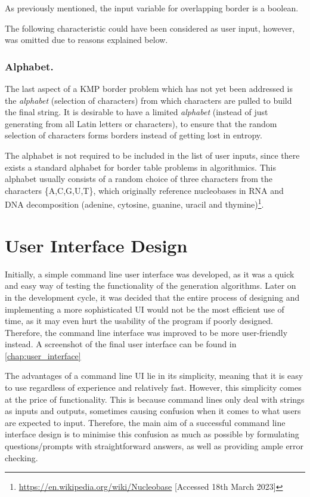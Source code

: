 \documentclass{l4proj}
\begin{document}
As previously mentioned, the input variable for overlapping border is a boolean.

The following characteristic could have been considered as user input, however, was omitted due to reasons explained below.

\subsubsection{Alphabet.}
\label{sec:alphabet}

The last aspect of a KMP border problem which has not yet been addressed is the \emph{alphabet} (selection of characters) from which characters are pulled to build the final string. It is desirable to have a limited \emph{alphabet} (instead of just generating from all Latin letters or characters), to ensure that the random selection of characters forms borders instead of getting lost in entropy.
 
The alphabet is not required to be included in the list of user inputs, since there exists a standard alphabet for border table problems in algorithmics. This alphabet usually consists of a random choice of three characters from the characters \{A,C,G,U,T\}, which originally reference nucleobases in RNA and DNA decomposition (adenine, cytosine, guanine, uracil and thymine)\footnote{\url{https://en.wikipedia.org/wiki/Nucleobase} [Accessed 18th March 2023]}.

\section{User Interface Design}

Initially, a simple command line user interface was developed, as it was a quick and easy way of testing the functionality of the generation algorithms. Later on in the development cycle, it was decided that the entire process of designing and implementing a more sophisticated UI would not be the most efficient use of time, as it may even hurt the usability of the program if poorly designed. Therefore, the command line interface was improved to be more user-friendly instead. A screenshot of the final user interface can be found in \autoref{chap:user_interface}

The advantages of a command line UI lie in its simplicity, meaning that it is easy to use regardless of experience and relatively fast. However, this simplicity comes at the price of functionality. This is because command lines only deal with strings as inputs and outputs, sometimes causing confusion when it comes to what users are expected to input. Therefore, the main aim of a successful command line interface design is to minimise this confusion as much as possible by formulating questions/prompts with straightforward answers, as well as providing ample error checking.
\end{document}
